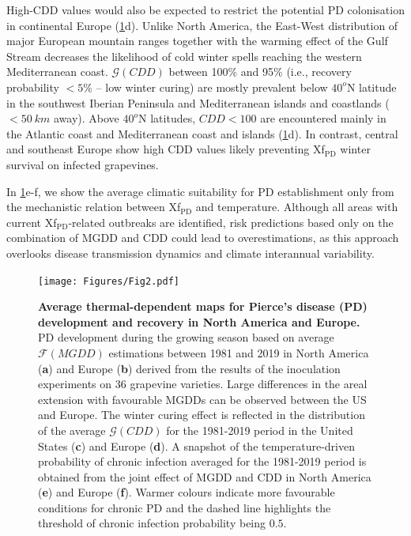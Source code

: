     High-CDD values would also be expected to restrict the potential PD
    colonisation in continental Europe (\cref{fig2}d). Unlike North America,
    the
    East-West distribution of major European mountain ranges together with the
    warming effect of the Gulf Stream decreases the likelihood of cold winter
    spells reaching the western Mediterranean coast. $\mathcal{G}(CDD)$ between
    100\% and 95\% (i.e., recovery probability $<5\%$ -- low winter curing) are
    mostly prevalent below $40^o$N latitude in the southwest Iberian Peninsula
    and
    Mediterranean islands and coastlands ($<\SI{50}{km}$ away). Above $40^o$N
    latitudes, $CDD < 100$ are encountered mainly in the Atlantic coast and
    Mediterranean coast and islands (\cref{fig2}d). In contrast, central and
    southeast Europe show high CDD values likely preventing Xf$_{\textrm{PD}}$
    winter survival on infected grapevines.

    In \cref{fig2}e-f, we show the average climatic suitability for PD
    establishment only from the mechanistic relation between Xf$_{\textrm{PD}}$
    and
    temperature. Although all areas with current Xf$_{\textrm{PD}}$-related
    outbreaks are identified, risk predictions based only on the combination of
    MGDD and CDD could lead to overestimations, as this approach overlooks
    disease
    transmission dynamics and climate interannual variability.

    \begin{figure}[H]
        \centering
        \texttt{[image: Figures/Fig2.pdf]}
        \caption[Average thermal-dependent maps for Pierce's disease
            (PD) development and recovery]{\textbf{Average
                thermal-dependent maps for Pierce's disease
                (PD)
                development and recovery in North America and Europe.} PD
            development during
            the growing season based on average $\mathcal{F}(MGDD)$ estimations
            between
            1981 and 2019 in North America (\textbf{a}) and Europe (\textbf{b})
            derived
            from the results of the inoculation experiments on 36 grapevine
            varieties.
            Large differences in the areal extension with favourable MGDDs can
            be observed
            between the US and Europe. The winter curing effect is reflected in
            the
            distribution of the average $\mathcal{G}(CDD)$ for the 1981-2019
            period in the
            United States (\textbf{c}) and Europe (\textbf{d}). A snapshot of
            the
            temperature-driven probability of chronic infection averaged for
            the 1981-2019
            period is obtained from the joint effect of MGDD and CDD in North
            America
            (\textbf{e}) and Europe (\textbf{f}). Warmer colours indicate more
            favourable
            conditions for chronic PD and the dashed line highlights the
            threshold of
            chronic infection probability being $0.5$.}
        \label{fig2}
    \end{figure}

